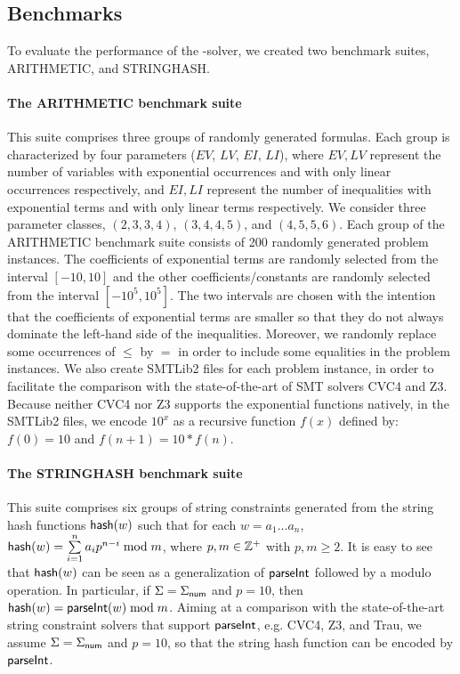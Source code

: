 \subsection{Benchmarks}

To evaluate the performance of the {\paexp}-solver, we created two benchmark suites, ARITHMETIC, and STRINGHASH.

\paragraph{The ARITHMETIC benchmark suite} 
This suite comprises three groups of randomly generated {\paexp} formulas. Each group is characterized by four parameters ($EV$, $LV$, $EI$, $LI$), where $EV, LV$ represent the number of variables with exponential occurrences and with only linear occurrences respectively, and $EI, LI$ represent the number of inequalities with exponential terms and with only linear terms respectively. 
We consider three parameter classes, $(2, 3, 3, 4)$, $(3, 4, 4, 5)$, and $(4, 5, 5, 6)$. 
Each group of the ARITHMETIC benchmark suite consists of 200 randomly generated problem instances. The coefficients of exponential terms are randomly selected from the interval $[-10, 10]$ and the other coefficients/constants are randomly selected from the interval $[-10^5, 10^5]$. The two intervals are chosen with the intention that the coefficients of exponential terms are smaller so that they do not always dominate the left-hand side of the inequalities. Moreover, we randomly replace some occurrences of $\le$ by $=$ in order to include some equalities in the problem instances. We also create SMTLib2 files for each problem instance, in order to facilitate the comparison with the state-of-the-art of SMT solvers CVC4 and Z3. Because neither CVC4 nor Z3 supports the exponential functions natively,  in the SMTLib2 files, we encode $10^x$ as a recursive function $f(x)$ defined by: $f(0) = 10$ and $f(n+1) = 10*f(n)$.

%

\paragraph{The STRINGHASH benchmark suite} 
This suite comprises six groups of string constraints generated from the string hash functions ${\sf hash}(w)$ such that for each $w= a_1 \ldots a_n$, 
${\sf hash}(w) = \sum \limits_{i = 1}^n a_i p^{n-i} \bmod m$, where $p, m \in \mathbb{Z}^+$ with $p, m \ge 2$. It is easy to see that ${\sf hash}(w)$ can be seen as a generalization of $\textsf{parseInt}$ followed by a modulo operation. In particular, if $\Sigma = \Sigma_{\sf num}$ and $p = 10$, then ${\sf hash}(w) = \textsf{parseInt}(w) \bmod m$. 
Aiming at a comparison with the state-of-the-art string constraint solvers that support $\textsf{parseInt}$, e.g. CVC4, Z3, and Trau, we assume $\Sigma =\Sigma_{\sf num}$ and $p = 10$, so that the string hash function can be encoded by $\textsf{parseInt}$. 

